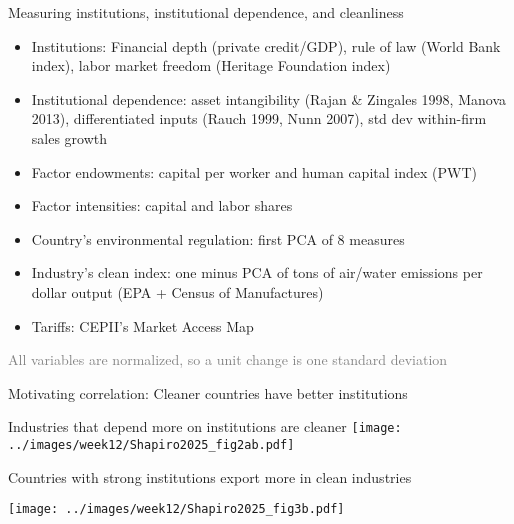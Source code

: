 \documentclass[11pt,notes=hide,aspectratio=169]{beamer}
\begin{document}
\begin{frame}{Measuring institutions, institutional dependence, and cleanliness}
\begin{itemize}
\item Institutions: Financial depth (private credit/GDP), rule of law (World Bank index), labor market freedom (Heritage Foundation index)
\item Institutional dependence: asset intangibility (Rajan \& Zingales 1998, Manova 2013), differentiated inputs (Rauch 1999, Nunn 2007), std dev within-firm sales growth
\item Factor endowments: capital per worker and human capital index (PWT)
\item Factor intensities: capital and labor shares
\item Country's environmental regulation: first PCA of 8 measures
\item Industry's clean index: one minus PCA of tons of air/water emissions per dollar output (EPA + Census of Manufactures)
\item Tariffs: CEPII's Market Access Map
\end{itemize}
\textcolor{gray}{All variables are normalized, so a unit change is one standard deviation}
\end{frame}
\begin{frame}{Motivating correlation: Cleaner countries have better institutions}
\end{frame}
\begin{frame}{Industries that depend more on institutions are cleaner}
\texttt{[image: ../images/week12/Shapiro2025\_fig2ab.pdf]}
\end{frame}
\begin{frame}{Countries with strong institutions export more in clean industries}
\begin{center}
\texttt{[image: ../images/week12/Shapiro2025\_fig3b.pdf]}
\end{center}
\end{frame}
\end{document}
